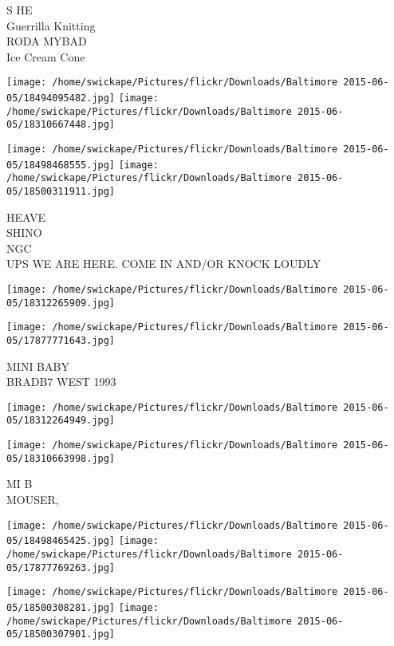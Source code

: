 \documentclass[10pt,letterpaper]{article}
\begin{document}
S HE\\
Guerrilla Knitting\\
RODA MYBAD\\
Ice Cream Cone\\
\pagebreak

\texttt{[image: /home/swickape/Pictures/flickr/Downloads/Baltimore 2015-06-05/18494095482.jpg]}
\texttt{[image: /home/swickape/Pictures/flickr/Downloads/Baltimore 2015-06-05/18310667448.jpg]}

\texttt{[image: /home/swickape/Pictures/flickr/Downloads/Baltimore 2015-06-05/18498468555.jpg]}
\texttt{[image: /home/swickape/Pictures/flickr/Downloads/Baltimore 2015-06-05/18500311911.jpg]}

HEAVE\\
SHINO\\
NGC\\
UPS WE ARE HERE.  COME IN AND/OR KNOCK LOUDLY\\
\pagebreak

\texttt{[image: /home/swickape/Pictures/flickr/Downloads/Baltimore 2015-06-05/18312265909.jpg]}

\vspace{0.25in}
\texttt{[image: /home/swickape/Pictures/flickr/Downloads/Baltimore 2015-06-05/17877771643.jpg]}

MINI BABY\\
BRADB7 WEST 1993\\
\pagebreak

\texttt{[image: /home/swickape/Pictures/flickr/Downloads/Baltimore 2015-06-05/18312264949.jpg]}

\vspace{0.25in}
\texttt{[image: /home/swickape/Pictures/flickr/Downloads/Baltimore 2015-06-05/18310663998.jpg]}

MI B\\
MOUSER,\\
\pagebreak

\texttt{[image: /home/swickape/Pictures/flickr/Downloads/Baltimore 2015-06-05/18498465425.jpg]}
\texttt{[image: /home/swickape/Pictures/flickr/Downloads/Baltimore 2015-06-05/17877769263.jpg]}

\texttt{[image: /home/swickape/Pictures/flickr/Downloads/Baltimore 2015-06-05/18500308281.jpg]}
\texttt{[image: /home/swickape/Pictures/flickr/Downloads/Baltimore 2015-06-05/18500307901.jpg]}
\end{document}
